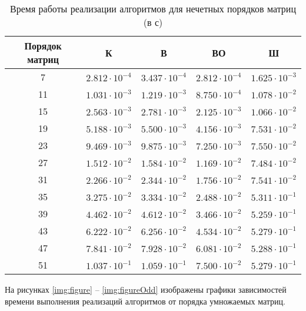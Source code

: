 \begin{table}[h]
	\begin{center}
		\begin{threeparttable}
			\captionsetup{justification=raggedright,singlelinecheck=off}
			\caption{Время работы реализации алгоритмов для нечетных порядков матриц (в с)}
			\label{tbl:time_measurements_odd}
			\begin{tabular}{|c|c|c|c|c|}
				\hline
				Порядок матриц &  К  & В & ВО & Ш \\
				\hline
			7 &$ 2.812\cdot 10^{-4} $&$ 3.437\cdot 10^{-4} $&$ 2.812\cdot 10^{-4} $&$ 1.625\cdot 10^{-3}$\\
		\hline
		11 &$ 1.031\cdot 10^{-3} $&$ 1.219\cdot 10^{-3} $&$ 8.750\cdot 10^{-4} $&$ 1.078\cdot 10^{-2}$\\
		\hline
		15 &$ 2.563\cdot 10^{-3} $&$ 2.781\cdot 10^{-3} $&$ 2.125\cdot 10^{-3} $&$ 1.066\cdot 10^{-2}$\\
		\hline
		19 &$ 5.188\cdot 10^{-3} $&$ 5.500\cdot 10^{-3} $&$ 4.156\cdot 10^{-3} $&$ 7.531\cdot 10^{-2}$\\
		\hline
		23 &$ 9.469\cdot 10^{-3} $&$ 9.875\cdot 10^{-3} $&$ 7.250\cdot 10^{-3} $&$ 7.550\cdot 10^{-2}$\\
		\hline
		27 &$ 1.512\cdot 10^{-2} $&$ 1.584\cdot 10^{-2} $&$ 1.169\cdot 10^{-2} $&$ 7.484\cdot 10^{-2}$\\
		\hline
		31 &$ 2.266\cdot 10^{-2} $&$ 2.344\cdot 10^{-2} $&$ 1.756\cdot 10^{-2} $&$ 7.541\cdot 10^{-2}$\\
		\hline
		35 &$ 3.275\cdot 10^{-2} $&$ 3.334\cdot 10^{-2} $&$ 2.488\cdot 10^{-2} $&$ 5.311\cdot 10^{-1}$\\
		\hline
		39 &$ 4.462\cdot 10^{-2} $&$ 4.612\cdot 10^{-2} $&$ 3.466\cdot 10^{-2} $&$ 5.259\cdot 10^{-1}$\\
		\hline
		43 &$ 6.222\cdot 10^{-2} $&$ 6.256\cdot 10^{-2} $&$ 4.534\cdot 10^{-2} $&$ 5.279\cdot 10^{-1}$\\
		\hline
		47 &$ 7.841\cdot 10^{-2} $&$ 7.928\cdot 10^{-2} $&$ 6.081\cdot 10^{-2} $&$ 5.288\cdot 10^{-1}$\\
		\hline
		51 &$ 1.037\cdot 10^{-1} $&$ 1.059\cdot 10^{-1} $&$ 7.500\cdot 10^{-2} $&$ 5.279\cdot 10^{-1}$\\
			\hline
			\end{tabular}
		\end{threeparttable}
	\end{center}
\end{table}

\clearpage
На рисунках \ref{img:figure} -- \ref{img:figureOdd} изображены графики зависимостей времени выполнения реализаций алгоритмов от порядка умножаемых матриц.

